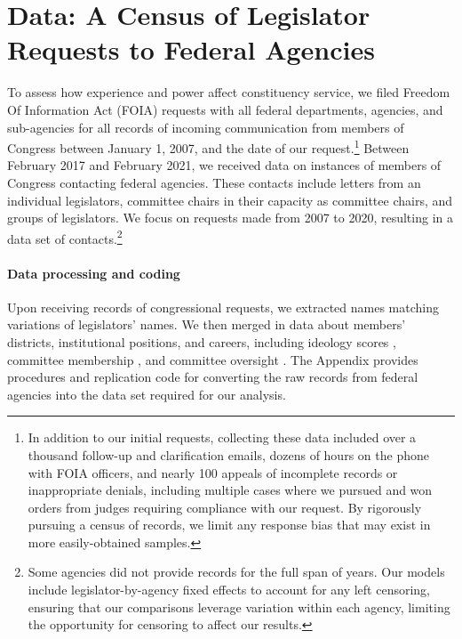 \documentclass[12pt]{article}
\begin{document}

\section{Data: A Census of Legislator Requests to Federal Agencies} \label{s:data}
To assess how experience and power affect constituency service, we filed  Freedom Of Information Act (FOIA) requests with all federal departments, agencies, and sub-agencies for all records of incoming communication from members of Congress between January 1, 2007, and the date of our request.\footnote{In addition to our initial requests, collecting these data included over a thousand follow-up and clarification emails, dozens of hours on the phone with FOIA officers, and nearly 100 appeals of incomplete records or inappropriate denials, including multiple cases where we pursued and won orders from judges requiring compliance with our request. By rigorously pursuing a census of records, we limit any response bias that may exist in more easily-obtained samples.} 
Between February 2017 and February 2021, we received data on  instances of members of Congress contacting federal agencies. These contacts include letters from an individual legislators, committee chairs in their capacity as committee chairs, and groups of legislators. We focus on requests made from 2007 to 2020, resulting in a data set of   contacts.\footnote{Some agencies did not provide records for the full span of years. Our models include legislator-by-agency fixed effects to account for any left censoring, ensuring that our comparisons leverage variation within each agency, limiting the opportunity for censoring to affect our results.} 



\paragraph{Data processing and coding} Upon receiving records of congressional requests, we extracted names matching variations of legislators' names. %
We then merged in data about members' districts, institutional positions, and careers, including ideology scores \citep{dwnominate2018}, committee membership \citep{StewartWoon2017}, and committee oversight \citep{LewisSelin2012}. %
The Appendix provides procedures and replication code for converting the raw records from federal agencies into the data set required for our analysis. 
\end{document}
